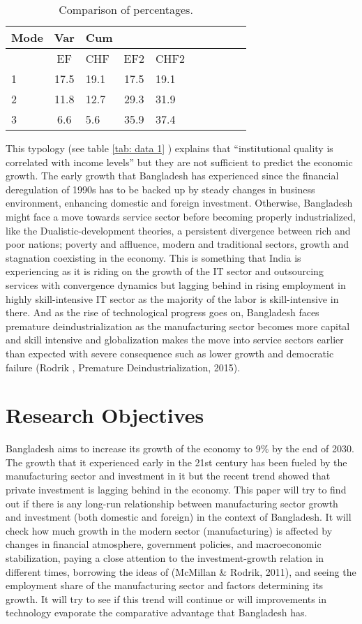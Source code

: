 \documentclass[11pt,a4paper]{article}
\begin{document}
\begin{table}[!h] 
\caption{Comparison of percentages.}
\begin{tabular}{lclclclclc}
\hline
\hline 
Mode &  Var  &  Cum\\
\hline
{}       & EF   & CHF    & EF2   & CHF2\\
1   &  17.5 & 19.1   & 17.5  & 19.1\\
2   &  11.8 & 12.7   & 29.3  &  31.9\\
3   &  6.6  &  5.6         & 35.9    &  37.4\\
\hline
\end{tabular}
\end{table}

This typology (see table \ref{tab: data 1} ) explains that “institutional quality is correlated with income levels” but they are not sufficient to predict the economic growth. The early growth that Bangladesh has experienced since the financial deregulation of 1990s has to be backed up by steady changes in business environment, enhancing domestic and foreign investment. Otherwise, Bangladesh might face a move towards service sector before becoming properly industrialized, like the Dualistic-development theories, a persistent divergence between rich and poor nations; poverty and affluence, modern and traditional sectors, growth and stagnation coexisting in the economy. This is something that India is experiencing as it is riding on the growth of the IT sector and outsourcing services with convergence dynamics but lagging behind in rising employment in highly skill-intensive IT sector as the majority of the labor is skill-intensive in there. And as the rise of technological progress goes on, Bangladesh faces premature deindustrialization as the manufacturing sector becomes more capital and skill intensive and globalization makes the move into service sectors earlier than expected with severe consequence such as lower growth and democratic failure (Rodrik , Premature Deindustrialization, 2015).

\section{Research Objectives}

\normalsize Bangladesh aims to increase its growth of the economy to 9\% by the end of 2030. The growth that it experienced early in the 21st century has been fueled by the manufacturing sector and investment in it but the recent trend showed that private investment is lagging behind in the economy. This paper will try to find out if there is any long-run relationship between manufacturing sector growth and investment (both domestic and foreign) in the context of Bangladesh. It will check how much growth in the modern sector (manufacturing) is affected by changes in financial atmosphere, government policies, and macroeconomic stabilization, paying a close attention to the investment-growth relation in different times, borrowing the ideas of (McMillan \& Rodrik, 2011), and seeing the employment share of the manufacturing sector and factors determining its growth. It will try to see if this trend will continue or will improvements in technology evaporate the comparative advantage that Bangladesh has.
\end{document}
